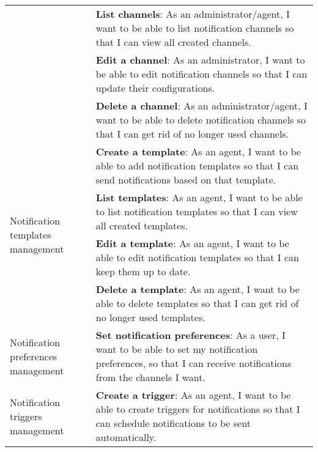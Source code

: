 \begin{longtable}{ | m{}  | m{} | }
      \cline{2-2}
                                                              & \textbf{List channels}: As an administrator/agent, I want to be able to list notification channels so that I can view all created channels.                                                   \\
      \cline{2-2}
                                                              & \textbf{Edit a channel}: As an administrator, I want to be able to edit notification channels so that I can update their configurations.                                                      \\

                                                              & \textbf{Delete a channel}: As an administrator/agent, I want to be able to delete notification channels so that I can get rid of no longer used channels.                                     \\
      \hline
      \multirow[t]{4}{5em}{Notification templates management} & \textbf{Create a template}: As an agent, I want to be able to add notification templates so that I can send notifications based on that template.                                             \\
      \cline{2-2}
                                                              & \textbf{List templates}: As an agent, I want to be able to list notification templates so that I can view all created templates.                                                              \\
      \cline{2-2}
                                                              & \textbf{Edit a template}: As an agent, I want to be able to edit notification templates so that I can keep them up to date.                                                                   \\
      \cline{2-2}
                                                              & \textbf{Delete a template}: As an agent, I want to be able to delete templates so that I can get rid of no longer used templates.                                                             \\
      \hline
      Notification preferences management                     & \textbf{Set notification preferences}: As a user, I want to be able to set my notification preferences, so that I can receive notifications from the channels I want.                         \\
      \hline
      \multirow[t]{4}{5em}{Notification triggers management}  & \textbf{Create a trigger}: As an agent, I want to be able to create triggers for notifications so that I can schedule notifications to be sent automatically.                                 \\

\end{longtable}
